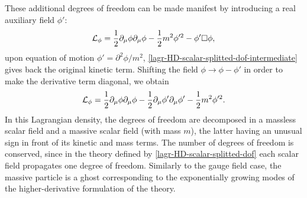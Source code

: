 These additional degrees of freedom can be made manifest by introducing a real auxiliary field $\phi'$:
\begin{equation}\label{lagr-HD-scalar-splitted-dof-intermediate}
{ \mathcal{L} }_\phi = 
	\frac{1}{2} \partial_\mu \phi \partial_\mu \phi	
	- \frac{1}{2 } m^2 \phi'^2
	- \phi' \square \phi,
\end{equation}
upon equation of motion \( \phi' =  \partial^2  \phi / m^2 \), \eqref{lagr-HD-scalar-splitted-dof-intermediate} gives back the original kinetic term. Shifting the field  \( \phi \rightarrow \phi - \phi' \) in order to make the derivative term diagonal, we obtain
\begin{equation}\label{lagr-HD-scalar-splitted-dof}
{ \mathcal{L} }_\phi = 
	\frac{1}{2} \partial_\mu \phi \partial_\mu \phi	
	- \frac{1}{2} \partial_\mu \phi' \partial_\mu \phi'
	- \frac{1}{2} m^2 \phi'^2.
\end{equation}
In this Lagrangian density, the degrees of freedom are decomposed in a massless scalar field and a massive scalar field (with mass $m$), the latter having an unusual sign in front of its kinetic and mass terms. The number of degrees of freedom is conserved, since in the theory defined by \eqref{lagr-HD-scalar-splitted-dof} each scalar field propagates one degree of freedom. Similarly to the gauge field case, the massive particle is a ghost corresponding to the exponentially growing modes of the higher-derivative  formulation of the theory.



